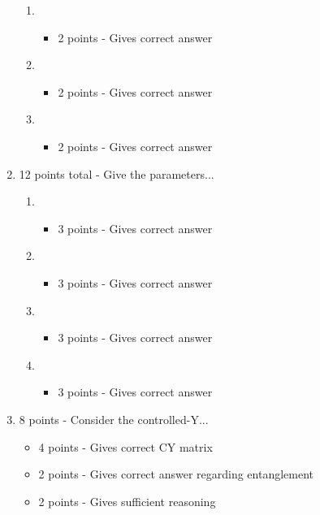 \documentclass[12pt]{article}
\begin{document}
\begin{enumerate}[font=\bfseries]
\begin{enumerate}
            \item \begin{itemize}
                \item 2 points - Gives correct answer
            \end{itemize}
            \item \begin{itemize}
                \item 2 points - Gives correct answer
            \end{itemize}
            \item \begin{itemize}
                \item 2 points - Gives correct answer
            \end{itemize}
        \end{enumerate}
    \item 12 points total - Give the parameters...
        \begin{enumerate}
            \item \begin{itemize}
                \item 3 points - Gives correct answer
            \end{itemize}
            \item \begin{itemize}
                \item 3 points - Gives correct answer
            \end{itemize}
            \item \begin{itemize}
                \item 3 points - Gives correct answer
            \end{itemize}
            \item \begin{itemize}
                \item 3 points - Gives correct answer
            \end{itemize}
        \end{enumerate}
    \item 8 points - Consider the controlled-Y...
        \begin{itemize}
            \item 4 points - Gives correct CY matrix
            \item 2 points - Gives correct answer regarding entanglement
            \item 2 points - Gives sufficient reasoning

\end{itemize}
\end{enumerate}
\end{document}

